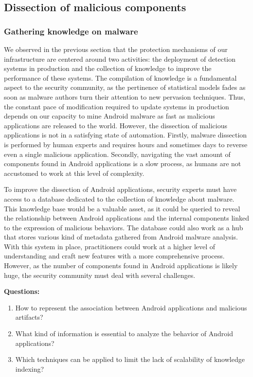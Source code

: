 \subsection{Dissection of malicious components}
\subsubsection{Gathering knowledge on malware}
We observed in the previous section that the protection mechanisms of our infrastructure are centered around two activities: the deployment of detection systems in production and the collection of knowledge to improve the performance of these systems.
The compilation of knowledge is a fundamental aspect to the security community, as the pertinence of statistical models fades as soon as malware authors turn their attention to new pervasion techniques.
Thus, the constant pace of modification required to update systems in production depends on our capacity to mine Android malware as fast as malicious applications are released to the world.
However, the dissection of malicious applications is not in a satisfying state of automation.
Firstly, malware dissection is performed by human experts and requires hours and sometimes days to reverse even a single malicious application.
Secondly, navigating the vast amount of components found in Android applications is a slow process, as humans are not accustomed to work at this level of complexity.

To improve the dissection of Android applications, security experts must have access to a database dedicated to the collection of knowledge about malware.
This knowledge base would be a valuable asset, as it could be queried to reveal the relationship between Android applications and the internal components linked to the expression of malicious behaviors.
The database could also work as a hub that stores various kind of metadata gathered from Android malware analysis.
With this system in place, practitioners could work at a higher level of understanding and craft new features with a more comprehensive process.
However, as the number of components found in Android applications is likely huge, the security community must deal with several challenges.

\begin{mdframed}[hidealllines=true,nobreak=true]
\textbf{Questions:}

\begin{enumerate}
	\item How to represent the association between Android applications and malicious artifacts?
	\item What kind of information is essential to analyze the behavior of Android applications?
	\item Which techniques can be applied to limit the lack of scalability of knowledge indexing?
\end{enumerate}
\end{mdframed}

